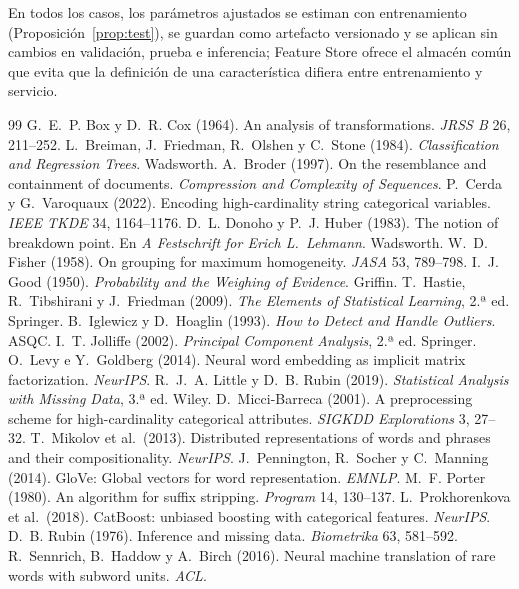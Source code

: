 \documentclass[11pt,a4paper]{article}
\theoremstyle{plain}
\theoremstyle{definition}
\theoremstyle{remark}
\newcommand{\1}{\mathbf{1}}
\begin{document}
En todos los casos, los parámetros ajustados se estiman con entrenamiento
(Proposición~\ref{prop:test}), se guardan como artefacto versionado y se
aplican sin cambios en validación, prueba e inferencia; Feature Store
ofrece el almacén común que evita que la definición de una característica
difiera entre entrenamiento y servicio.

\begin{thebibliography}{99}\small
{} G.~E.~P. Box y D.~R. Cox (1964). An analysis of transformations. \emph{JRSS B} 26, 211--252.
 L.~Breiman, J.~Friedman, R.~Olshen y C.~Stone (1984). \emph{Classification and Regression Trees}. Wadsworth.
 A.~Broder (1997). On the resemblance and containment of documents. \emph{Compression and Complexity of Sequences}.
 P.~Cerda y G.~Varoquaux (2022). Encoding high-cardinality string categorical variables. \emph{IEEE TKDE} 34, 1164--1176.
 D.~L. Donoho y P.~J. Huber (1983). The notion of breakdown point. En \emph{A Festschrift for Erich L.\ Lehmann}. Wadsworth.
 W.~D. Fisher (1958). On grouping for maximum homogeneity. \emph{JASA} 53, 789--798.
 I.~J. Good (1950). \emph{Probability and the Weighing of Evidence}. Griffin.
 T.~Hastie, R.~Tibshirani y J.~Friedman (2009). \emph{The Elements of Statistical Learning}, 2.ª ed. Springer.
 B.~Iglewicz y D.~Hoaglin (1993). \emph{How to Detect and Handle Outliers}. ASQC.
 I.~T. Jolliffe (2002). \emph{Principal Component Analysis}, 2.ª ed. Springer.
 O.~Levy e Y.~Goldberg (2014). Neural word embedding as implicit matrix factorization. \emph{NeurIPS}.
 R.~J.~A. Little y D.~B. Rubin (2019). \emph{Statistical Analysis with Missing Data}, 3.ª ed. Wiley.
 D.~Micci-Barreca (2001). A preprocessing scheme for high-cardinality categorical attributes. \emph{SIGKDD Explorations} 3, 27--32.
 T.~Mikolov et al.\ (2013). Distributed representations of words and phrases and their compositionality. \emph{NeurIPS}.
 J.~Pennington, R.~Socher y C.~Manning (2014). GloVe: Global vectors for word representation. \emph{EMNLP}.
 M.~F. Porter (1980). An algorithm for suffix stripping. \emph{Program} 14, 130--137.
 L.~Prokhorenkova et al.\ (2018). CatBoost: unbiased boosting with categorical features. \emph{NeurIPS}.
 D.~B. Rubin (1976). Inference and missing data. \emph{Biometrika} 63, 581--592.
 R.~Sennrich, B.~Haddow y A.~Birch (2016). Neural machine translation of rare words with subword units. \emph{ACL}.

\end{thebibliography}
\end{document}
